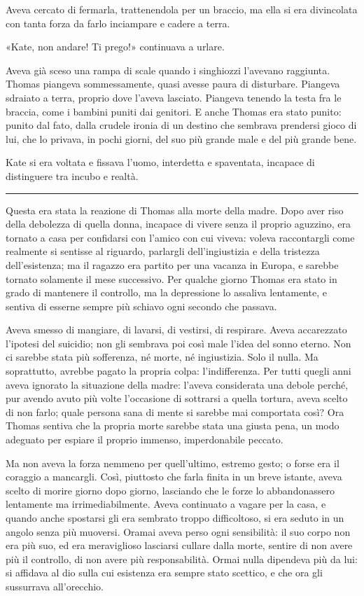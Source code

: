 \documentclass[a4paper,oneside,11pt]{memoir}
\begin{document}
Aveva cercato di fermarla, trattenendola per un braccio, ma ella si era
divincolata con tanta forza da farlo inciampare e cadere a terra.

«Kate, non andare! Ti prego!» continuava a urlare.

Aveva già sceso una rampa di scale quando i singhiozzi l'avevano raggiunta.
Thomas piangeva sommessamente, quasi avesse paura di disturbare. Piangeva
sdraiato a terra, proprio dove l'aveva lasciato. Piangeva tenendo la testa fra
le braccia, come i bambini puniti dai genitori. E anche Thomas era stato punito:
punito dal fato, dalla crudele ironia di un destino che sembrava prendersi gioco
di lui, che lo privava, in pochi giorni, del suo più grande male e del più
grande bene.

Kate si era voltata e fissava l'uomo, interdetta e spaventata, incapace di
distinguere tra incubo e realtà.

\plainbreak{1}

Questa era stata la reazione di Thomas alla morte della madre. Dopo aver riso
della debolezza di quella donna, incapace di vivere senza il proprio aguzzino,
era tornato a casa per confidarsi con l'amico con cui viveva: voleva
raccontargli come realmente si sentisse al riguardo, parlargli dell'ingiustizia
e della tristezza dell'esistenza; ma il ragazzo era partito per una vacanza in
Europa, e sarebbe tornato solamente il mese successivo. Per qualche giorno
Thomas era stato in grado di mantenere il controllo, ma la depressione lo
assaliva lentamente, e sentiva di esserne sempre più schiavo ogni secondo che
passava.

Aveva smesso di mangiare, di lavarsi, di vestirsi, di respirare. Aveva
accarezzato l'ipotesi del suicidio; non gli sembrava poi così male l'idea del
sonno eterno. Non ci sarebbe stata più sofferenza, né morte, né ingiustizia.
Solo il nulla. Ma soprattutto, avrebbe pagato la propria colpa: l'indifferenza.
Per tutti quegli anni aveva ignorato la situazione della madre: l'aveva
considerata una debole perché, pur avendo avuto più volte l'occasione di
sottrarsi a quella tortura, aveva scelto di non farlo; quale persona sana di
mente si sarebbe mai comportata così? Ora  Thomas sentiva che la propria morte
sarebbe stata una giusta pena, un modo adeguato per espiare il proprio immenso,
imperdonabile peccato.

Ma non aveva la forza nemmeno per quell'ultimo, estremo gesto; o forse era il
coraggio a mancargli. Così, piuttosto che farla finita in un breve istante,
aveva scelto di morire giorno dopo giorno, lasciando che le forze lo
abbandonassero lentamente ma irrimediabilmente. Aveva continuato a vagare per la
casa, e quando anche spostarsi gli era sembrato troppo difficoltoso, si era
seduto in un angolo senza più muoversi. Oramai aveva perso ogni sensibilità: il
suo corpo non era più suo, ed era meraviglioso lasciarsi cullare dalla morte,
sentire di non avere più il controllo, di non avere più responsabilità. Ormai
nulla dipendeva più da lui: si affidava al dio sulla cui esistenza era sempre
stato scettico, e che ora gli sussurrava all'orecchio.
\end{document}

